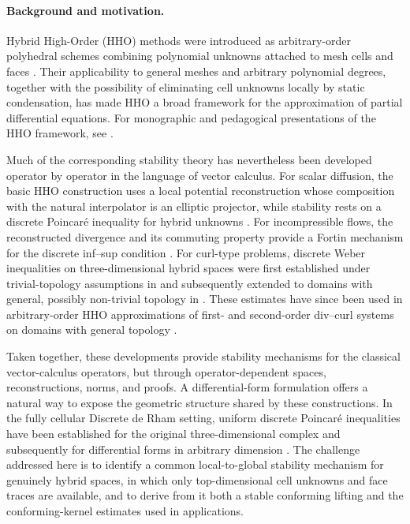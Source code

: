\documentclass[a4paper,11pt]{article}
\theoremstyle{definition}
\begin{document}
\paragraph*{Background and motivation.}

Hybrid High-Order (HHO) methods were introduced as arbitrary-order polyhedral schemes combining polynomial unknowns attached to mesh cells and faces \cite{Di-Pietro.Ern.Lemaire:14,Di-Pietro.Ern:15}.
Their applicability to general meshes and arbitrary polynomial degrees, together with the possibility of eliminating cell unknowns locally by static condensation, has made HHO a broad framework for the approximation of partial differential equations.
For monographic and pedagogical presentations of the HHO framework, see \cite{Di-Pietro.Droniou:20,Cicuttin.Ern.Pignet:21,Di-Pietro.Droniou:25b}.

Much of the corresponding stability theory has nevertheless been developed operator by operator in the language of vector calculus.
For scalar diffusion, the basic HHO construction uses a local potential reconstruction whose composition with the natural interpolator is an elliptic projector, while stability rests on a discrete Poincar\'e inequality for hybrid unknowns \cite{Di-Pietro.Droniou:20}.
For incompressible flows, the reconstructed divergence and its commuting property provide a Fortin mechanism for the discrete inf--sup condition \cite{Di-Pietro.Droniou:20}.
For curl-type problems, discrete Weber inequalities on three-dimensional hybrid spaces were first established under trivial-topology assumptions in \cite{Chave.Di-Pietro.Lemaire:22} and subsequently extended to domains with general, possibly non-trivial topology in \cite{Lemaire.Pitassi:25}.
These estimates have since been used in arbitrary-order HHO approximations of first- and second-order div--curl systems on domains with general topology \cite{Dalphin.Ducreux.Lemaire.Pitassi:25}.

Taken together, these developments provide stability mechanisms for the classical vector-calculus operators, but through operator-dependent spaces, reconstructions, norms, and proofs.
A differential-form formulation offers a natural way to expose the geometric structure shared by these constructions.
In the fully cellular Discrete de Rham setting, uniform discrete Poincar\'e inequalities have been established for the original three-dimensional complex and subsequently for differential forms in arbitrary dimension \cite{Di-Pietro.Hanot:24,Di-Pietro.Droniou.ea:25}.
The challenge addressed here is to identify a common local-to-global stability mechanism for genuinely hybrid spaces, in which only top-dimensional cell unknowns and face traces are available, and to derive from it both a stable conforming lifting and the conforming-kernel estimates used in applications.
\end{document}

